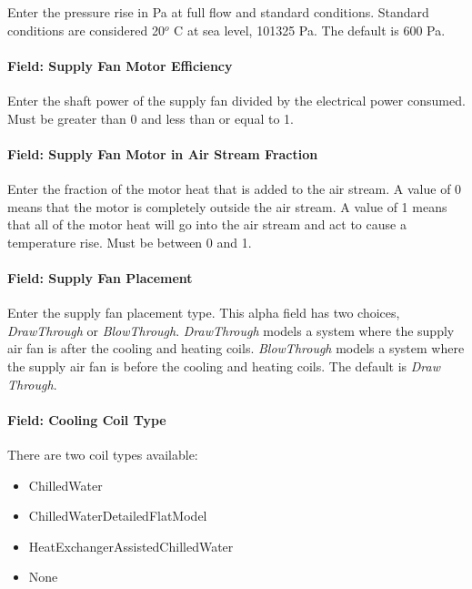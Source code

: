 Enter the pressure rise in Pa at full flow and standard conditions. Standard conditions are considered 20\(^{o}\) C at sea level, 101325 Pa. The default is 600 Pa.

\paragraph{Field: Supply Fan Motor Efficiency}\label{field-supply-fan-motor-efficiency-10}

Enter the shaft power of the supply fan divided by the electrical power consumed. Must be greater than 0 and less than or equal to 1.

\paragraph{Field: Supply Fan Motor in Air Stream Fraction}\label{field-supply-fan-motor-in-air-stream-fraction-6}

Enter the fraction of the motor heat that is added to the air stream. A value of 0 means that the motor is completely outside the air stream. A value of 1 means that all of the motor heat will go into the air stream and act to cause a temperature rise. Must be between 0 and 1.

\paragraph{Field: Supply Fan Placement}\label{field-supply-fan-placement-9}

Enter the supply fan placement type. This alpha field has two choices, \emph{DrawThrough} or \emph{BlowThrough}. \emph{DrawThrough} models a system where the supply air fan is after the cooling and heating coils. \emph{BlowThrough} models a system where the supply air fan is before the cooling and heating coils. The default is \emph{Draw Through}.

\paragraph{Field: Cooling Coil Type}\label{field-cooling-coil-type-10}

There are two coil types available:

\begin{itemize}
\item
  ChilledWater
\item
  ChilledWaterDetailedFlatModel
\item
  HeatExchangerAssistedChilledWater
\item
  None
\end{itemize}

